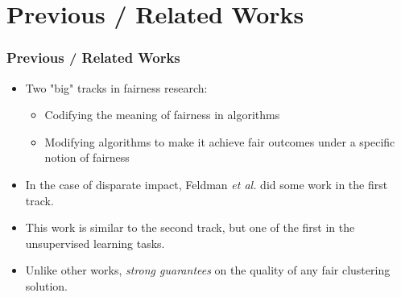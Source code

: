 \documentclass{beamer}
\begin{document}

\section{Previous / Related Works}

\begin{frame}
\frametitle{Previous / Related Works}

\begin{itemize}
    \item Two "big" tracks in fairness research:
    	\begin{itemize}
    		\item Codifying the meaning of fairness in algorithms
    		\item Modifying algorithms to make it achieve fair outcomes under a specific notion of fairness
    	\end{itemize} \pause
    
	\item In the case of disparate impact, Feldman {\it et al.} did some work in the first track. \pause
    
    \item This work is similar to the second track, but one of the first in the unsupervised learning tasks. \pause
    
    \item Unlike other works, {\it strong guarantees} on the quality of any fair clustering solution.
\end{itemize}
\end{frame}
\end{document}
